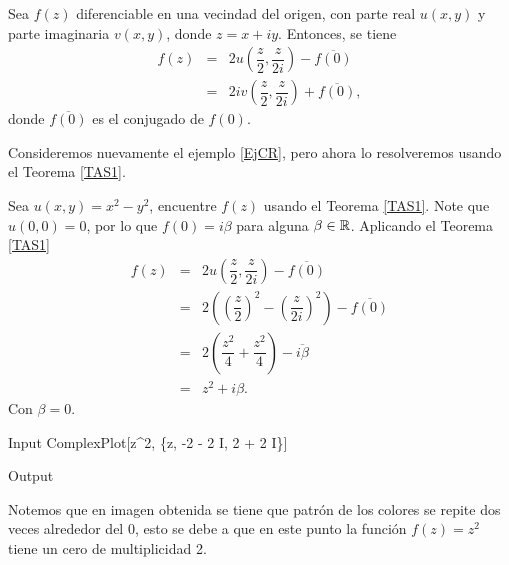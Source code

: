 \begin{teor}\label{TAS1}
	Sea $f(z)$ diferenciable en una vecindad del origen, con parte real $u(x, y)$ y parte imaginaria $v(x, y)$, donde 
	$z = x + iy$. Entonces, se tiene
	\[
		\begin{array}{ccl}
			f(z)&=&2u\left(\dfrac{z}{2},\dfrac{z}{2i}\right)-\overline{f(0)}\\
			&=&2iv\left(\dfrac{z}{2},\dfrac{z}{2i}\right)+\overline{f(0)},
		\end{array}
	\]
	donde $\overline{f(0)}$ es el conjugado de $f(0)$.
\end{teor}
Consideremos nuevamente el ejemplo \ref{EjCR}, pero ahora lo resolveremos usando el Teorema \ref{TAS1}.
\begin{Ejem}	
	Sea $u(x,y)=x^2-y^2$, encuentre  $f(z)$ usando el Teorema \ref{TAS1}.
	\solu
	Note que $u(0, 0) = 0$, por lo que $f(0) = i\beta$ para alguna $\beta\in\mathbb{R}$. Aplicando el Teorema \ref{TAS1}
	\[
		\begin{array}{ccl}
			f(z)&=&2u\left(\dfrac{z}{2},\dfrac{z}{2i}\right)-\overline{f(0)}\\
			&=&2\left(\left(\dfrac{z}{2}\right)^2-\left(\dfrac{z}{2i}\right)^2\right)-\overline{f(0)}\\
			&=&2\left(\dfrac{z^2}{4}+\dfrac{z^2}{4}\right)-\overline{i\beta}\\
			&=&z^2+i\beta.
		\end{array}
	\]
	Con  $\beta=0$. 
	\begin{mmaCell}{Input}
		ComplexPlot[z^2, \{z, -2 - 2 I, 2 + 2 I\}]
	\end{mmaCell}
	
	\begin{mmaCell}[moregraphics={moreig={scale=.25}}]{Output}
	\end{mmaCell}
 Notemos que en imagen obtenida se tiene que patrón de los colores se repite dos veces alrededor del $0$, esto se debe a que en este punto la función $f(z)=z^2$ tiene un cero de multiplicidad 2.\endproof
\end{Ejem}

